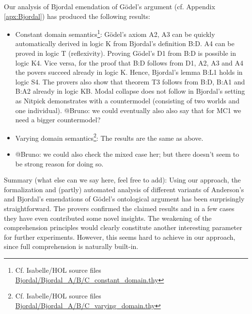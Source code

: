 \documentclass{birkjour}
\theoremstyle{definition}
\theoremstyle{remark}
\numberwithin{equation}{section}
\begin{document}
Our analysis of Bjordal emendation of G\"odel's argument (cf. Appendix \ref{apx:Bjordal}) has produced the following results:
\begin{itemize}
\item Constant domain semantics\footnote{Cf. Isabelle/HOL source files
    \url{Bjordal/Bjordal_A/B/C_constant_domain.thy}}: G\"odel's axiom
  A2, A3 can be quickly automatically derived in logic K from
  Bjordal's definition B:D. A4 can be proved in logic T
  (reflexivity). Proving G\"odel's D1 from B:D is possible in logic
  K4. Vice versa, for the proof that B:D follows from D1, A2, A3 and
  A4 the povers succeed already in logic K. Hence, Bjordal's lemma
  B:L1 holds in logic S4. The provers also show that theorem T3
  follows from B:D, B:A1 and B:A2 already in logic KB. Modal collapse
  does not follow in Bjordal's setting as Nitpick demonstrates with a
  countermodel (consisting of two worlds and one individual). @Bruno: we could eventually also
  also say that for MC1 we need a bigger countermodel?
\item Varying domain semantics\footnote{Cf. Isabelle/HOL source files
    \url{Bjordal/Bjordal_A/B/C_varying_domain.thy}}: The results are
  the same as above. 
\item @Bruno: we could also check the mixed case her; but there doesn't seem to be strong reason for doing so.
\end{itemize}

Summary (what else can we say here, feel free to add): Using our approach, the formalization and (partly) automated
analysis of different variants of Anderson's and Bjordal's emendations
of G\"odel's ontological argument has been surprisingly
straightforward. The provers confirmed the claimed results and in a
few cases they have even contributed some novel insights. The
weakening of the comprehension principles would clearly constitute
another interesting parameter for further experiments. However, this
seems hard to achieve in our approach, since full comprehension is
naturally built-in.




\end{document}
